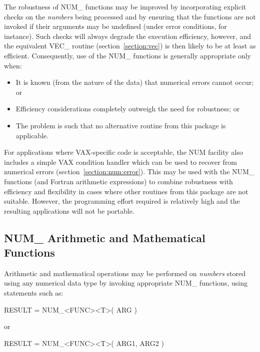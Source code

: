 \documentclass[11pt,nolof]{starlink}
\providecommand{\name}[1]{#1}
\begin{document}
The robustness of \name{NUM\_} functions may be improved by incorporating
explicit checks on the \emph{numbers} being processed and by ensuring that
the functions are not invoked if their arguments may be undefined (under
error conditions, for instance).
Such checks will always degrade the execution efficiency, however, and the
equivalent \name{VEC\_} routine (section~\ref{section:vec}) is then likely
to be at least as efficient.
Consequently, use of the \name{NUM\_} functions is generally appropriate
only when:

\begin{itemize}

\item It is known (from the nature of the data) that numerical errors cannot
occur; or

\item Efficiency considerations completely outweigh the need for robustness;
or

\item The problem is such that no alternative routine from this package
is applicable.

\end{itemize}

For applications where \name{VAX}-specific code is acceptable, the
\name{NUM} facility also includes a simple \name{VAX} condition handler
which can be used to recover from numerical errors
(section~\ref{section:num:error}).
This may be used with the \name{NUM\_} functions (and Fortran arithmetic
expressions) to combine robustness with efficiency and flexibility in cases
where other routines from this package are not suitable.
However, the programming effort required is relatively high and the
resulting applications will not be portable.

\subsection{\name{NUM\_} Arithmetic and Mathematical Functions}

Arithmetic and mathematical operations may be performed on \emph{numbers}
stored using any numerical data type by invoking appropriate \name{NUM\_}
functions, using statements such as:

\begin{terminalv}
RESULT = NUM_<FUNC><T>( ARG )
\end{terminalv}
or
\begin{terminalv}
RESULT = NUM_<FUNC><T>( ARG1, ARG2 )
\end{terminalv}
\end{document}
